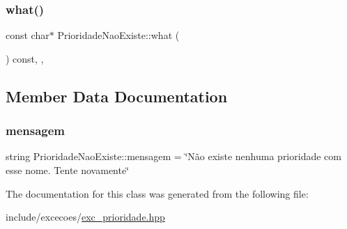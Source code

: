 \subsubsection{\texorpdfstring{what()}{what()}}
{\footnotesize\ttfamily const char$\ast$ Prioridade\+Nao\+Existe\+::what (\begin{DoxyParamCaption}{ }\end{DoxyParamCaption}) const\hspace{0.3cm}{\ttfamily [inline]}, {\ttfamily [override]}, {\ttfamily [noexcept]}}



\subsection{Member Data Documentation}
\mbox{\label{classPrioridadeNaoExiste_a5c675d0cd81b87bb26b6cac15b29cfb2}} 
\subsubsection{\texorpdfstring{mensagem}{mensagem}}
{\footnotesize\ttfamily string Prioridade\+Nao\+Existe\+::mensagem = \char`\"{}Não existe nenhuma prioridade com esse nome. Tente novamente\char`\"{}\hspace{0.3cm}{\ttfamily [private]}}



The documentation for this class was generated from the following file\+:\begin{DoxyCompactItemize}
\item 
include/excecoes/\hyperlink{exc__prioridade_8hpp}{exc\+\_\+prioridade.\+hpp}\end{DoxyCompactItemize}
